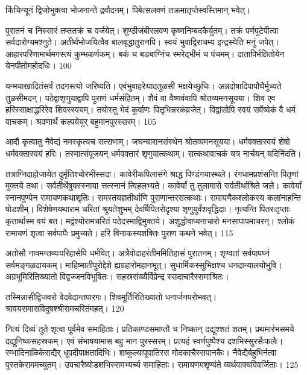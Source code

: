   किंचिन्यूनं द्विजोभुक्त्वा भोजनान्ते द्रवौदनम्।
 पिबेत्सलवणं तक्रमातृप्तेस्वस्तिमान् भवेत्।
 
पुरातनं च निस्सारं तप्ततक्रं च वर्जयेत्।
 शुण्ठीजंबीरलवण कृष्णनिम्बदकैर्युतम्।
 तक्रं पर्णपुटेपीत्वा सर्वदारोग्यमश्नुते।
 अतीर्थभोजयित्वैव बालवृद्धातुरानपि।
 स्वयं भुवाद्विराचम्य इन्द्रस्येति मनुं जपेत्।
 आहारपरिणामार्थमगस्त्यं कुम्भकर्णकम्।
 बकं च बडबाग्निंच स्मरेद्भीमं च पंचमम्।
 दातापिर्भक्षितोयेन येनपीतोमहोदधिः।
 100

  यन्मयाखादितंसर्वं तदगस्त्यो जरिष्यति।
 एवंभुवाहरेःपादतुळसी भक्षयेच्छुचिः।
 अन्नदोषादिपापौघैर्मुच्यते तुळसीमदन्।
 पठेद्वाशृणुयाद्वापि पुराणं धर्मसंहितम्।
 शैवं वा वैष्णवंवापि श्रोतव्यमनसूयया।
 शिव एव हरिस्साक्षाद्धरिरेव शिवस्स्वयम्।
 तयोस्तु भेदं कुर्वाणः पितृभिन्नरकंव्रजेत्।
 विद्वांसोपि स्वयं सर्वेष्येकं वै धर्म वाचकम्।
 श्रवणार्थं कल्पयेयुर् बहुमानपुरस्सरम्।
 105

  आदौ कृत्वातु नैवेद्यं नमस्कृत्यच सत्सभाम्।
 जघन्यासनसंस्थेन श्रोतव्यमनसूयया।
 धर्मवक्तास्वयं शेषो धर्मवक्तास्वयं हरिः।
 तस्मात्संपूजयन् धर्मवक्तारं शृणुयात्कथाम्।
 सत्कथावाचकं यत्र नार्चयन् यदिनिंदति।
 
तत्राग्निदाहोजायेत दुर्मृतिश्चोरभीस्सदा।
 कावेरीकपिलासंगे श्राद्ध पिण्डंगयास्थले।
 रंगधामप्रशंसन्ति पितृणां मुक्तये तथा।
 सर्वतीर्थेषुयस्स्नाया त्तत्स्नानं त्विहलभ्यते।
 कावेर्यां तु तुलामासे सर्वतीर्थाश्रिते जले।
 कावेर्यां स्नानपुण्येन रामायणकथाशृतिः।
 समस्तयज्ञतीर्थाणि पुराणान्तरसत्कथाः।
 रामायणैकश्लोकस्य कलांनाहन्ति षोडशीम्।
 विशेषेणयथाराम चरितां श्रूयतेशुभम् देवर्षिपितरोदृश्या शृणुयुर्वंशवृद्धिदाः।
 नृत्यन्ति पितरःतृप्ताः कृतार्थास्म वयं बत।
 मद्वंश्योरामचरितं पठेदस्माद्विमुक्तये।
 अशुद्धोवाप्यनाचारो मनसापापमाचरन्।
 श्लोकं रामायणं शृत्वा सर्वपापैः प्रमुच्यते।
 हरि विनाकस्यशक्तिः पुराण कथने भवेत्।
 115

  अतोसौ नावमन्तव्यःपरिहासेपि धर्मवित्।
 अत्रैवोदाहरंतीममितिहासं पुरातनम्।
 शृण्वतां सर्वपापघ्नं सर्वमङ्गळदायकम्।
 माहिष्मातीपुरोद्देशे ह्यग्रहारोमहानभूत्।
 सुधार्मिकस्सुभिक्षश्च धनदान्यालयोभुवि।
 अग्रभूमिरितिख्यातो विद्वज्जनविभूषितः।
 सहस्रसंख्यैर्विप्रेन्द्र स्सदाचारैस्समाश्रितः।
 
तस्मिन्नासीद्विजवरो वेदवेदान्तपारगः।
 शिवमूर्तिरितिख्यातो धनार्जनपरोभवत्।
 श्रावयसमासविदुषश्श्रीरामचरितंमहत्।
 120

  नित्यं दिव्यं तुते शृत्वा पूर्वमेव समाहिताः।
 प्रतिकाण्डसमाप्तौ च निष्कान् दद्युश्शतं शतम्।
 प्रथमारंभसमये दद्युनिष्कसहस्रकम्।
 एवं संभाषयामास बहु मान पुरस्सरम्।
 प्रत्यहं स्वर्णपुष्पैश्च दशभिस्सुरसैःफलैः।
 रम्भादिनाळिकेराद्यैर् धूपदीपाक्षतादिभिः।
 शष्कुल्यापूपातिरस मोदकाचैस्सपानकैः।
 नैवेद्यैर्बहुभिर्नत्वा पुस्तकेराममच्युतम्।
 उपचारैष्योडशभिस्समभ्यर्च्य समाहिताः।
 रामायणमशृण्वंते व्यर्थवाक्यविवर्जिताः।
 125

